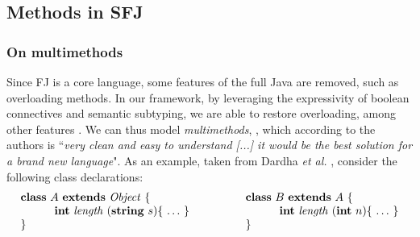\documentclass[runningheads]{llncs}
\begin{document}


\subsection{Methods in SFJ}
\label{sec:methods}
\subsubsection{On multimethods}
Since FJ is a core language, some features of the full Java are removed, such as overloading methods.
In our framework, by leveraging the expressivity of boolean connectives and semantic subtyping, we are able to restore overloading, among other features \cite[\S 8.4]{Dardha2017}.
We can thus model \emph{multimethods}, \cite{BC97}, which according to the authors is ``\emph{very clean and easy to understand [...] it would be the best solution for a brand new language}".
As an example, taken from Dardha \emph{et al.}  \cite{Dardha2013,Dardha2017}, consider the following class declarations:
$$
\begin{array}{ll}
\mathbf{class} \  A \ \mathbf{extends }\  \mathit{Object}\ \{
&
\qquad
\mathbf{class} \  B \ \mathbf{extends }\  A\ \{
\\
	\qquad\quad \mathbf{int}\ \mathit{length}\ (\mathbf{string}\ s)\{\ \ldots\ \}\qquad
&
	\qquad\qquad\quad \mathbf{int}\ \mathit{length}\ (\mathbf{int}\ n)\{\ \ldots\ \}
\\
\}
&
\qquad \}
\end{array}
$$
\end{document}
